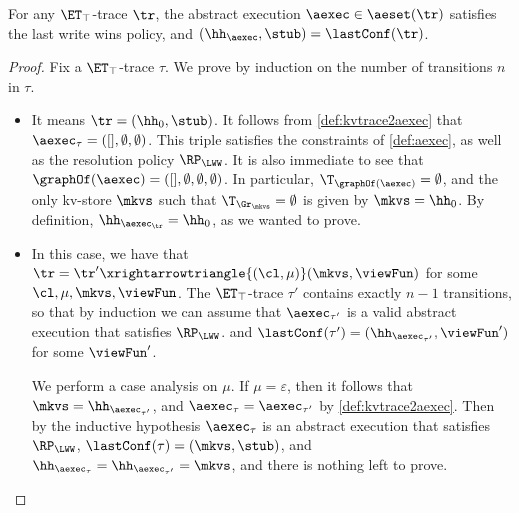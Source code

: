 \begin{proposition}
\label{prop:kvtrace2aexec}
For any $\ET_{\top}$-trace $\tr$, 
the abstract execution $\aexec \in \aeset(\tr)$ satisfies the last write wins policy,
and $(\hh_{\aexec}, \stub) = \lastConf(\tr)$.
\end{proposition}
\begin{proof}
Fix a $\ET_{\top}$-trace $\tau$. 
We prove by induction on the number of transitions $n$ in $\tau$. 
\begin{itemize}
\item {}
It means $\tr = (\hh_{0}, \stub)$.
It follows from \cref{def:kvtrace2aexec} that $\aexec_{\tau} = ([], \emptyset, \emptyset)$. 
This triple satisfies the constraints of \cref{def:aexec}, as well as the resolution policy $\RP_{\LWW}$. 
It is also immediate to see that $\graphOf(\aexec) = ([], \emptyset, \emptyset, \emptyset)$.
In particular, $\T_{\graphOf(\aexec)} = \emptyset$, 
and the only kv-store $\mkvs$ such that $\T_{\Gr_{\mkvs}} = \emptyset$ 
is given by $\mkvs = \hh_{0}$. 
By definition, $\hh_{\aexec_{\tr}} = \hh_{0}$, as we wanted to prove.

\item {} In this case, we have that $\tr = \tr' \xrightarrowtriangle{(\cl, \mu)} (\mkvs, \viewFun)$ 
for some $\cl, \mu, \mkvs, \viewFun$. The $\ET_{\top}$-trace $\tau'$ contains exactly $n-1$ transitions, 
so that by induction we can assume that $\aexec_{\tau'}$ is a valid abstract execution that satisfies 
$\RP_{\LWW}$. and $\lastConf(\tau') = (\hh_{\aexec_{\tau'}}, \viewFun')$ for some $\viewFun'$. 

We perform a case analysis on $\mu$. 
If $\mu = \varepsilon$, then it follows that $\mkvs = \hh_{\aexec_{\tau'}}$, 
and $\aexec_{\tau} = \aexec_{\tau'}$ by \cref{def:kvtrace2aexec}. 
Then by the inductive hypothesis $\aexec_{\tau}$ is an abstract execution that satisfies $\RP_{\LWW}$,
$\lastConf(\tau) = (\mkvs, \stub)$, and $\hh_{\aexec_{\tau}} = \hh_{\aexec_{\tau'}} = \mkvs$, 
and there is nothing left to prove. 


\end{itemize}
\end{proof}
